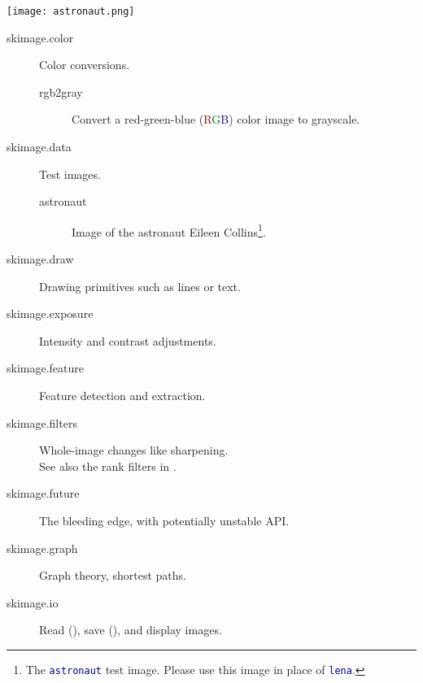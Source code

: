 \documentclass[nohyper, %
               ]{tufte-handout}
\newcommand{\rgb}{\textcolor{DarkRed}{R}\textcolor{DarkGreen}{G}\textcolor{DarkBlue}{B}}
\newcommand{\pyblue}[1]{\textcolor{DarkBlue}{\pyv{#1}}}
\begin{document}
  \begin{marginfigure}[0cm]%
    \texttt{[image: astronaut.png]}%
    \label{fig:astronaut}%
  \end{marginfigure}%
  \begin{description}%
    \item[skimage.color] Color conversions.
    \begin{description}
      \item[rgb2gray] Convert a red-green-blue (\rgb) color image to grayscale.
    \end{description}
    \item[skimage.data] Test images.
    \begin{description}
      \item[astronaut] Image of the astronaut Eileen Collins\footnote[2][-0.2cm]{The \textcolor{DarkBlue}{\texttt{astronaut}} test image. Please use this image in place of \textcolor{DarkBlue}{\texttt{lena}}.}.
    \end{description}
    \item[skimage.draw] Drawing primitives such as lines or text.
    \item[skimage.exposure] Intensity and contrast adjustments.
    \item[skimage.feature] Feature detection and extraction.
    \item[skimage.filters] Whole-image changes like sharpening. \hfill \\See also the rank filters in .
    \item[skimage.future] The bleeding edge, with potentially unstable API.
    \item[skimage.graph] Graph theory, shortest paths.
    \item[skimage.io] Read (), save (), and display images.

\end{description}
\end{document}
